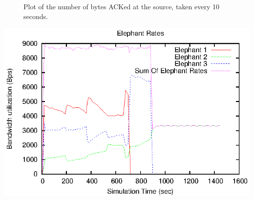 \documentclass{article}
\begin{document}
\begin{figure}[h]
  \begin{centering}
    
    \caption{Plot of the number of bytes ACKed at the source, taken every 10 seconds.}
    \label{fig:ack_plot}
  \end{centering}
\end{figure}

\begin{center}
  \includegraphics{elephant_bw.eps}
\end{center}
\end{document}

